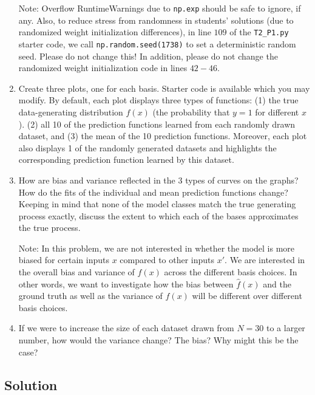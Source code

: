 \documentclass[submit]{harvardml}
\begin{document}
\begin{problem}
\begin{enumerate}
   Note: Overflow RuntimeWarnings due to \verb|np.exp| should be safe to ignore, if any. Also, to reduce stress from randomness in students' solutions (due to randomized weight initialization differences), in line $109$ of the \verb|T2_P1.py| starter code, we call \verb|np.random.seed(1738)| to set a deterministic random seed. Please do not change this! In addition, please do not change the randomized weight initialization code in lines $42-46$.

\item Create three plots, one for each basis. Starter code is available which you may modify.
By default, each plot displays three types of functions:
(1) the true data-generating distribution $f(x)$ (the probability that $y=1$ for different $x$).
(2) all 10 of the prediction functions learned from each randomly drawn dataset, and
(3) the mean of the 10 prediction functions.
Moreover, each plot also displays 1 of the randomly generated datasets and highlights the corresponding prediction function learned by this dataset.

\item How are bias and variance reflected in the 3 types of curves on
  the graphs?  How do the fits of the individual and mean prediction
  functions change?  Keeping in mind that none of the model classes
  match the true generating process exactly, discuss the extent to
  which each of the bases approximates the true process.

  Note: In this problem, we are not interested in whether the model is
  more biased for certain inputs $x$ compared to other inputs $x'$.
  We are interested in the overall bias and variance of $\hat{f}(x)$
  across the different basis choices. In other words, we want to investigate how the bias between $\hat{f}(x)$ and the ground truth as well as the variance of $\hat{f}(x)$ will be different over different basis choices. 

\item If we were to increase the size of each dataset drawn from $N = 30$ to a larger number, how would the variance change? The bias?   Why might this be the case?

\end{enumerate}

\end{problem}

\newpage

\subsection*{Solution}
\end{document}
